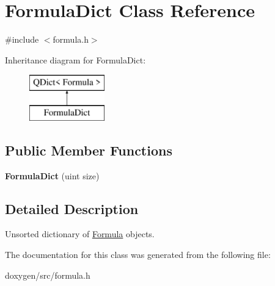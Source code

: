 \hypertarget{class_formula_dict}{}\section{Formula\+Dict Class Reference}
\label{class_formula_dict}


{\ttfamily \#include $<$formula.\+h$>$}

Inheritance diagram for Formula\+Dict\+:\begin{figure}[H]
\begin{center}
\leavevmode
\includegraphics[height=2.000000cm]{class_formula_dict}
\end{center}
\end{figure}
\subsection*{Public Member Functions}
\begin{DoxyCompactItemize}
\item 
\mbox{\label{class_formula_dict_a7f3213a2a404f76483a75a4b77158423}} 
{\bfseries Formula\+Dict} (uint size)
\end{DoxyCompactItemize}


\subsection{Detailed Description}
Unsorted dictionary of \mbox{\hyperlink{class_formula}{Formula}} objects. 

The documentation for this class was generated from the following file\+:\begin{DoxyCompactItemize}
\item 
doxygen/src/formula.\+h\end{DoxyCompactItemize}
